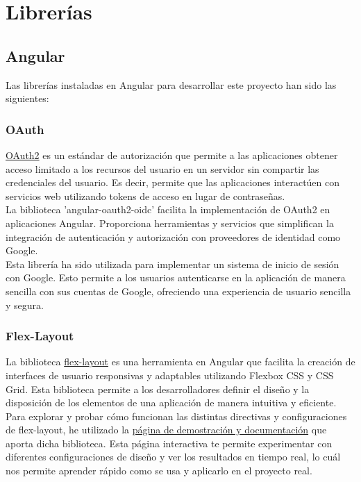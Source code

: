 \section{Librerías}

\subsection{Angular}
Las librerías instaladas en Angular para desarrollar este proyecto han sido las siguientes:
\subsubsection{OAuth}
\href{https://www.npmjs.com/package/angular-oauth2-oidc}{OAuth2} es un estándar de autorización que permite a las aplicaciones obtener acceso limitado a los recursos del usuario en un servidor sin compartir las credenciales del usuario. Es decir, permite que las aplicaciones interactúen con servicios web utilizando tokens de acceso en lugar de contraseñas. \\
La biblioteca 'angular-oauth2-oidc' facilita la implementación de OAuth2 en aplicaciones Angular. Proporciona herramientas y servicios que simplifican la integración de autenticación y autorización con proveedores de identidad como Google. \\
Esta librería ha sido utilizada para implementar un sistema de inicio de sesión con Google. Esto permite a los usuarios autenticarse en la aplicación de manera sencilla con sus cuentas de Google, ofreciendo una experiencia de usuario sencilla y segura.
\subsubsection{Flex-Layout}
La biblioteca \href{https://www.npmjs.com/package/@angular/flex-layout}{flex-layout} es una herramienta en Angular que facilita la creación de interfaces de usuario responsivas y adaptables utilizando Flexbox CSS y CSS Grid. Esta biblioteca permite a los desarrolladores definir el diseño y la disposición de los elementos de una aplicación de manera intuitiva y eficiente. \\
Para explorar y probar cómo funcionan las distintas directivas y configuraciones de flex-layout, he utilizado la \href{https://tburleson-layouts-demos.firebaseapp.com/#/docs}{ página de demostración y documentación} que aporta dicha biblioteca. Esta página interactiva  te permite experimentar con diferentes configuraciones de diseño y ver los resultados en tiempo real, lo cuál nos permite aprender rápido como se usa y aplicarlo en el proyecto real.
